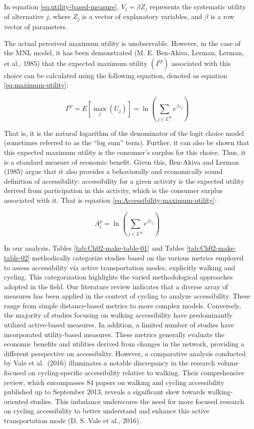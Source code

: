 \documentclass[
11pt, %
oneside, %
english, %
singlespacing, %
]{macthesis} %
\begin{document}
In equation \ref{eq:utility-based-measure}, \({V_j} = \beta{Z_j}\) represents the systematic utility of alternative \(j\), where \({Z_j}\) is a vector of explanatory variables, and \(\beta\) is a row vector of parameters.

The actual perceived maximum utility is unobservable. However, in the case of the MNL model, it has been demonstrated (M. E. Ben-Akiva, Lerman, Lerman, et al., 1985) that the expected maximum utility \((I^{ip})\) associated with this choice can be calculated using the following equation, denoted as equation \ref{eq:maximum-utility}:

\begin{equation}
I^{ip} = E\left[ \max_j (U_j) \right] = \ln\left(\sum_{j \in L^{ip}} e^{\beta z_j} \right)
\label{eq:maximum-utility}
\end{equation}

That is, it is the natural logarithm of the denominator of the logit choice model (sometimes referred to as the ``log sum'' term). Further, it can also be shown that this expected maximum utility is the consumer's surplus for this choice. Thus, it is a standard measure of economic benefit. Given this, Ben-Akiva and Lerman (1985) argue that it also provides a behaviorally and economically sound definition of accessibility: accessibility for a given activity is the expected utility derived from participation in this activity, which is the consumer surplus associated with it. That is equation \ref{eq:Accessibility-maximum-utility}:

\begin{equation}
A^{p}_i = \ln \left(\sum_{j \in L^{ip}} e^{\beta z_j} \right)
\label{eq:Accessibility-maximum-utility}
\end{equation}

In our analysis, Tables \ref{tab:Ch02-make-table-01} and Tables \ref{tab:Ch02-make-table-02} methodically categorize studies based on the various metrics employed to assess accessibility via active transportation modes, explicitly walking and cycling. This categorization highlights the varied methodological approaches adopted in the field. Our literature review indicates that a diverse array of measures has been applied in the context of cycling to analyze accessibility. These range from simple distance-based metrics to more complex models. Conversely, the majority of studies focusing on walking accessibility have predominantly utilized active-based measures. In addition, a limited number of studies have incorporated utility-based measures. These metrics generally evaluate the economic benefits and utilities derived from changes in the network, providing a different perspective on accessibility. However, a comparative analysis conducted by Vale et al.~(2016) illuminates a notable discrepancy in the research volume focused on cycling-specific accessibility relative to walking. Their comprehensive review, which encompasses 84 papers on walking and cycling accessibility published up to September 2013, reveals a significant skew towards walking-oriented studies. This imbalance underscores the need for more focused research on cycling accessibility to better understand and enhance this active transportation mode (D. S. Vale et al., 2016).
\end{document}
